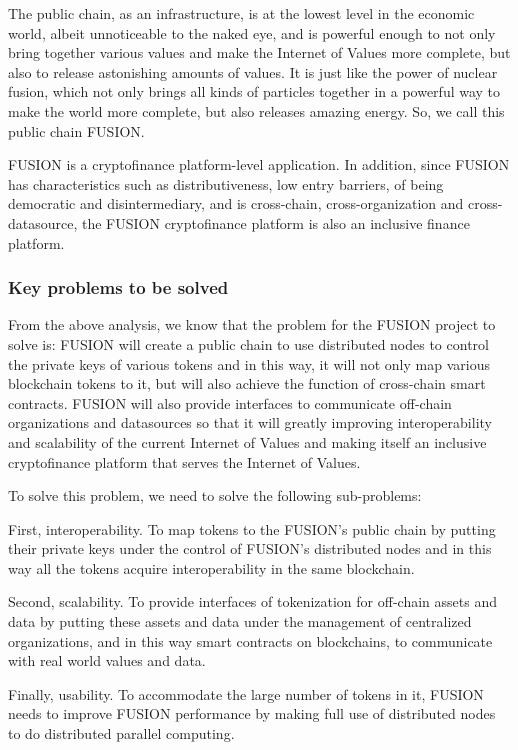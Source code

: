 \documentclass[a4paper,12pt]{article}
\begin{document}
The public chain, as an infrastructure, is at the lowest level in the economic world, albeit unnoticeable to the naked eye, and is powerful enough to not only bring together various values and make the Internet of Values more complete, but also to release astonishing amounts of values. It is just like the power of nuclear fusion, which not only brings all kinds of particles together in a powerful way to make the world more complete, but also releases amazing energy. So, we call this public chain FUSION.

FUSION is a cryptofinance platform-level application. In addition, since FUSION has characteristics such as distributiveness, low entry barriers, of being democratic and disintermediary, and is cross-chain, cross-organization and cross-datasource, the FUSION cryptofinance platform is also an inclusive finance platform.

\subsubsection{Key problems to be solved}

From the above analysis, we know that the problem for the FUSION project to solve is: FUSION will create a public chain to use distributed nodes to control the private keys of various tokens and in this way, it will not only map various blockchain tokens to it, but will also achieve the function of cross-chain smart contracts. FUSION will also provide interfaces to communicate off-chain organizations and datasources so that it will greatly improving interoperability and scalability of the current Internet of Values and making itself an inclusive cryptofinance platform that serves the Internet of Values.

To solve this problem, we need to solve the following sub-problems:

First, interoperability. To map tokens to the FUSION's public chain by putting their private keys under the control of FUSION's distributed nodes and in this way all the tokens acquire interoperability in the same blockchain.

Second, scalability. To provide interfaces of tokenization for off-chain assets and data by putting these assets and data under the management of centralized organizations, and in this way smart contracts on blockchains, to communicate with real world values and data.

Finally, usability. To accommodate the large number of tokens in it, FUSION needs to improve FUSION performance by making full use of distributed nodes to do distributed parallel computing.
\end{document}
